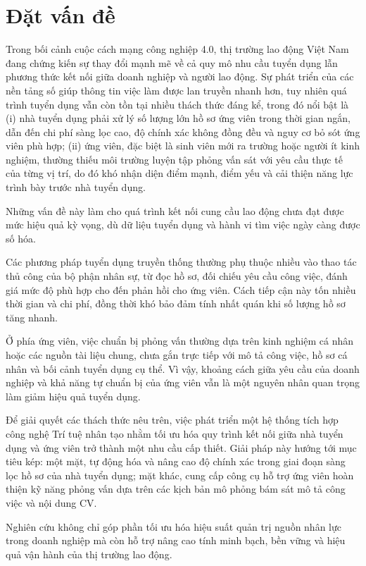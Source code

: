 \documentclass[../DoAn.tex]{subfiles}
\begin{document}
\section{Đặt vấn đề}
\label{section:1.1}
Trong bối cảnh cuộc cách mạng công nghiệp 4.0, thị trường lao động Việt Nam đang chứng kiến sự thay đổi mạnh mẽ về cả quy mô nhu cầu tuyển dụng lẫn phương thức kết nối giữa doanh nghiệp và người lao động. Sự phát triển của các nền tảng số giúp thông tin việc làm được lan truyền nhanh hơn, tuy nhiên quá trình tuyển dụng vẫn còn tồn tại nhiều thách thức đáng kể, trong đó nổi bật là (i) nhà tuyển dụng phải xử lý số lượng lớn hồ sơ ứng viên trong thời gian ngắn, dẫn đến chi phí sàng lọc cao, độ chính xác không đồng đều và nguy cơ bỏ sót ứng viên phù hợp; (ii) ứng viên, đặc biệt là sinh viên mới ra trường hoặc người ít kinh nghiệm, thường thiếu môi trường luyện tập phỏng vấn sát với yêu cầu thực tế của từng vị trí, do đó khó nhận diện điểm mạnh, điểm yếu và cải thiện năng lực trình bày trước nhà tuyển dụng.

Những vấn đề này làm cho quá trình kết nối cung cầu lao động chưa đạt được mức hiệu quả kỳ vọng, dù dữ liệu tuyển dụng và hành vi tìm việc ngày càng được số hóa.

Các phương pháp tuyển dụng truyền thống thường phụ thuộc nhiều vào thao tác thủ công của bộ phận nhân sự, từ đọc hồ sơ, đối chiếu yêu cầu công việc, đánh giá mức độ phù hợp cho đến phản hồi cho ứng viên. Cách tiếp cận này tốn nhiều thời gian và chi phí, đồng thời khó bảo đảm tính nhất quán khi số lượng hồ sơ tăng nhanh.

Ở phía ứng viên, việc chuẩn bị phỏng vấn thường dựa trên kinh nghiệm cá nhân hoặc các nguồn tài liệu chung, chưa gắn trực tiếp với mô tả công việc, hồ sơ cá nhân và bối cảnh tuyển dụng cụ thể. Vì vậy, khoảng cách giữa yêu cầu của doanh nghiệp và khả năng tự chuẩn bị của ứng viên vẫn là một nguyên nhân quan trọng làm giảm hiệu quả tuyển dụng.

Để giải quyết các thách thức nêu trên, việc phát triển một hệ thống tích hợp công nghệ Trí tuệ nhân tạo nhằm tối ưu hóa quy trình kết nối giữa nhà tuyển dụng và ứng viên trở thành một nhu cầu cấp thiết. Giải pháp này hướng tới mục tiêu kép: một mặt, tự động hóa và nâng cao độ chính xác trong giai đoạn sàng lọc hồ sơ của nhà tuyển dụng; mặt khác, cung cấp công cụ hỗ trợ ứng viên hoàn thiện kỹ năng phỏng vấn dựa trên các kịch bản mô phỏng bám sát mô tả công việc và nội dung CV.

Nghiên cứu không chỉ góp phần tối ưu hóa hiệu suất quản trị nguồn nhân lực trong doanh nghiệp mà còn hỗ trợ nâng cao tính minh bạch, bền vững và hiệu quả vận hành của thị trường lao động.
\end{document}
